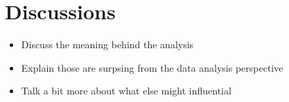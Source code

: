 \section{Discussions}

\begin{itemize}
\item Discuss the meaning behind the analysis
\item Explain those are surpsing from the data analysis perspective
\item Talk a bit more about what else might influential
\end{itemize}